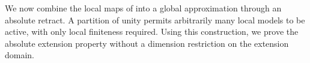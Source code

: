 We now combine the local maps of 
into a global approximation through an absolute retract.
A partition of unity permits arbitrarily many local models to be active,
with only local finiteness required.
Using this construction,
we prove the absolute extension property without
a dimension restriction on the extension domain.

